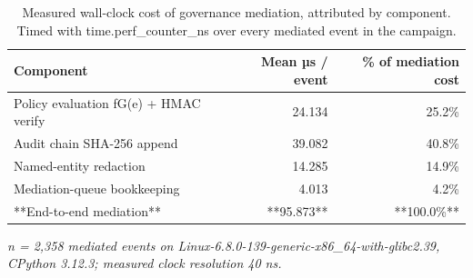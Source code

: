 \begin{table}[htbp]
\centering
\small
\caption{Measured wall-clock cost of governance mediation, attributed by component. Timed with time.perf\_counter\_ns over every mediated event in the campaign.}
\label{tab:gmais-8}
\begin{tabular}{lrr}
\toprule
Component & Mean µs / event & \% of mediation cost \\
\midrule
Policy evaluation fG(e) + HMAC verify & 24.134 & 25.2\% \\
Audit chain SHA-256 append & 39.082 & 40.8\% \\
Named-entity redaction & 14.285 & 14.9\% \\
Mediation-queue bookkeeping & 4.013 & 4.2\% \\
**End-to-end mediation** & **95.873** & **100.0\%** \\
\bottomrule
\end{tabular}
\par\vspace{2pt}\footnotesize\emph{n = 2,358 mediated events on Linux-6.8.0-139-generic-x86\_64-with-glibc2.39, CPython 3.12.3; measured clock resolution 40 ns.}
\end{table}
